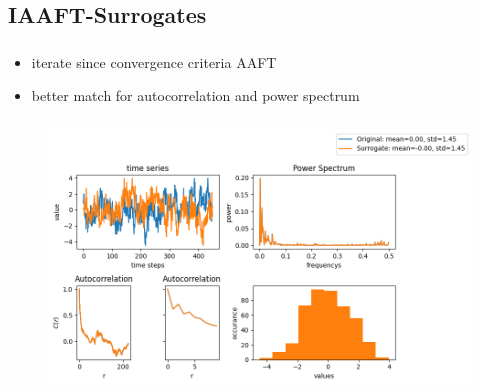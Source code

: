 \subsection{IAAFT-Surrogates}
\begin{frame}
  \frametitle{\insertsectionhead}
  \framesubtitle{\insertsubsectionhead}
  \begin{itemize}
    \item iterate since convergence criteria AAFT
    \item better match for autocorrelation and power spectrum
  \end{itemize}
\end{frame}

\begin{frame}
  \frametitle{\insertsectionhead}
  \framesubtitle{\insertsubsectionhead}
\begin{figure}
  \centering
  \includegraphics[height=0.8\textheight]{figs/IAAFT.png}
\end{figure}
\end{frame}

